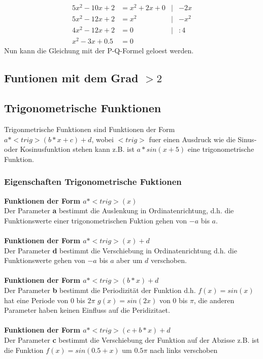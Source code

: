 \documentclass[a4paper]{article} %
\begin{document}
		\begin{align*}
			5x^2-10x+2 &= x^2+2x+0 & 	|&-2x\\
			5x^2-12x+2 &= x^2 & 		|&-x^2\\
			4x^2-12x+2 &= 0   & 		|&:4\\
			x^2-3x+0.5 &= 0
		\end{align*}
			Nun kann die Gleichung mit der P-Q-Formel geloest werden.
		\newpage
		\subsection{Funtionen mit dem Grad $> 2$}
		\subsection{Trigonometrische Funktionen}
		Trigonmetrische Funktionen sind Funktionen der Form $a*<trig>(b*x+c)+d$, wobei $<trig>$ fuer einen Ausdruck wie die Sinus- oder Kosinusfunktion stehen kann z.B. ist $a*sin(x+5)$ eine trigonometrische Funktion.
		\subsubsection{Eigenschaften Trigonometrische Fuktionen\\}
		\textbf{Funktionen der Form $a*<trig>(x)$\\}
		Der Parameter \textbf{a} bestimmt die Auslenkung in Ordinatenrichtung, d.h. die Funktionswerte einer trigonometrischen Fuktion gehen von $-a$ bis  $a$.\\\\
		\textbf{Funktionen der Form $a*<trig>(x)+d$\\}
		Der Parameter \textbf{d} bestimmt die Verschiebung in Ordinatenrichtung d.h. die Funktionswerte gehen von $-a$ bis $a$ aber um $d$ verschoben.\\\\
		\textbf{Funktionen der Form $a*<trig>(b*x)+d$\\}
		Der Parameter \textbf{b} bestimmt die Periodizität der Funktion d.h. $f(x)=sin(x)$ hat eine Periode von $0$ bis $2\pi$ $g(x)=sin(2x)$ von $0$ bis $\pi$, die anderen Parameter haben keinen Einfluss auf die Peridizitaet.\\\\
		\textbf{Funktionen der Form $a*<trig>(c+b*x)+d$\\}
		Der Parameter \textbf{c} bestimmt die Verschiebung der Funktion auf der Abzisse z.B. ist die Funktion $f(x)=sin(0.5+x)$
		um $0.5\pi$ nach links verschoben
\end{document}
